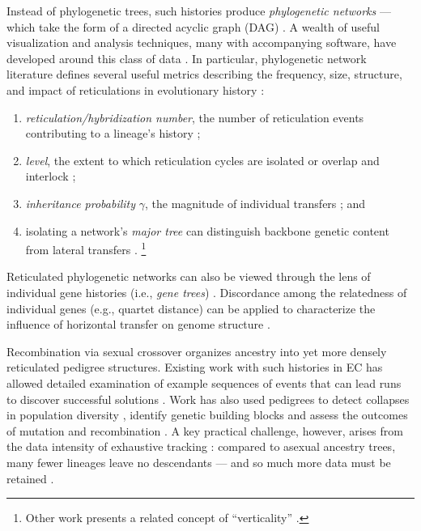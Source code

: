 Instead of phylogenetic trees, such histories produce \textit{phylogenetic networks} --- which take the form of a directed acyclic graph (DAG) \citep{huson2005application,baroni2005framework}.
A wealth of useful visualization and analysis techniques, many with accompanying software, have developed around this class of data \citep{huson2011phylogenetic,solislemus2017phylonetworks,huson2025sketch,panssen2024phylox,schliep2026tanggle,than2008phylonet}.
In particular, phylogenetic network literature defines several useful metrics describing the frequency, size, structure, and impact of reticulations in evolutionary history \citep{zhang2022weighting}:
\begin{enumerate}
\item \textit{reticulation/hybridization number}, the number of reticulation events contributing to a lineage's history \citep{baroni2005bounding,baroni2006hybrids};
\item \textit{level}, the extent to which reticulation cycles are isolated or overlap and interlock \citep{choy2004computing};
\item \textit{inheritance probability} $\gamma$, the magnitude of individual transfers \citep{yu2011coalescent}; and
\item isolating a network's \textit{major tree} can distinguish backbone genetic content from lateral transfers \citep{solislemus2016inferring}.
\unskip\footnote{%
Other work presents a related concept of ``verticality'' \citep{nagies2020spectrum}.
}
\end{enumerate}

Reticulated phylogenetic networks can also be viewed through the lens of individual gene histories (i.e., \textit{gene trees}) \citep{maddison1997gene,avise1989gene,pamilo1988relationships}.
Discordance among the relatedness of individual genes (e.g., quartet distance) can be applied to characterize the influence of horizontal transfer on genome structure \citep{solislemus2016inferring,zhang2022weighting}.

Recombination via sexual crossover organizes ancestry into yet more densely reticulated pedigree structures.
Existing work with such histories in EC has allowed detailed examination of example sequences of events that can lead runs to discover successful solutions \citep{burlacu2013visualization,mcphee2016visualizing,mcphee2016using}.
Work has also used pedigrees to detect collapses in population diversity \citep{burlacu2023population,kuber2014ancestral}, identify genetic building blocks \citep{burlacu2023population,burlacu2015building} and assess the outcomes of mutation and recombination \citep{donatucci2014analysis,burlacu2015methods}.
A key practical challenge, however, arises from the data intensity of exhaustive tracking \citep{mcphee2016using}: compared to asexual ancestry trees, many fewer lineages leave no descendants --- and so much more data must be retained \citep{dolson2020interpreting}.

